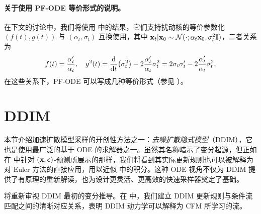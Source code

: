 \paragraph{关于使用 PF-ODE 等价形式的说明。}
在下文的讨论中，我们将使用  中的结果，它们支持扰动核的等价参数化 $(f(t), g(t))$ 与 $(\alpha_t,\sigma_t)$ 互换使用，其中
${\mathbf{x}}_t | {\mathbf{x}}_0 \sim \mathcal{N}(\cdot;\alpha_t {\mathbf{x}}_0,\sigma_t^2{\mathbf{I}})$，二者关系为
\[
f(t) = \frac{\alpha_t'}{\alpha_t}, 
\quad
g^2(t) = \frac{\mathop{}\!\mathrm{d}}{\mathop{}\!\mathrm{d} t} \big(\sigma_t^2\big) 
         - 2 \frac{\alpha_t'}{\alpha_t} \sigma_t^2
       = 2\sigma_t\sigma_t' - 2 \frac{\alpha_t'}{\alpha_t} \sigma_t^2.
\]
在这些关系下，PF-ODE 可以写成几种等价形式（参见 ）。


\clearpage
\newpage

\section{\texorpdfstring{DDIM}{DDIM}}\label{sec:revisit-ddim}
本节介绍加速扩散模型采样的开创性方法之一：\emph{去噪扩散隐式模型}（DDIM），它也是使用最广泛的基于 ODE 的求解器之一。虽然其名称暗示了变分起源，但正如在  中针对 $({\mathbf{x}},{\bm{\epsilon}})$-预测所展示的那样，我们将看到其实际更新规则也可以被解释为对 Euler 方法的直接应用，用以近似  中的积分。这种 ODE 视角不仅为 DDIM 提供了有原理的重新解读，也为设计更灵活、更高效的快速采样器奠定了基础。

 将重新审视 DDIM 最初的变分推导。在  中，我们建立 DDIM 更新规则与条件流匹配之间的清晰对应关系，表明 DDIM 动力学可以解释为 CFM 所学习的流。





